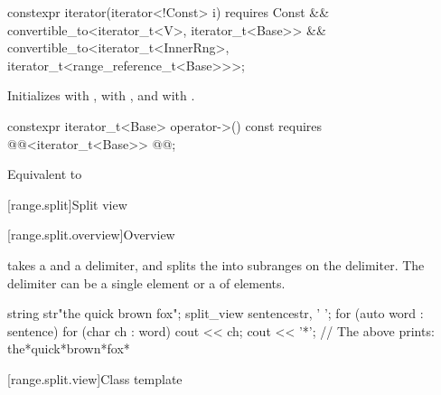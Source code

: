 \documentclass{wg21}
\begin{document}
\begin{itemdecl}
	constexpr iterator(iterator<!Const> i)
		requires Const &&
		convertible_to<iterator_t<V>, iterator_t<Base>> &&
		convertible_to<iterator_t<InnerRng>,
		iterator_t<range_reference_t<Base>>>;
\end{itemdecl}

\begin{itemdescr}
	\pnum
	\effects
	Initializes  with ,
	 with , and
	 with .
\end{itemdescr}


\begin{itemdecl}
	constexpr iterator_t<Base> operator->() const
	requires @@<iterator_t<Base>> @@;
\end{itemdecl}

\begin{itemdescr}
	\pnum
	\effects
	Equivalent to 
\end{itemdescr}

[range.split]{Split view}

[range.split.overview]{Overview}

\pnum
{} takes a  and a delimiter, and splits
the  into subranges on the delimiter. The delimiter can be
a single element or a  of elements.

\pnum
\begin{example}
\begin{codeblock}
	string str{"the quick brown fox"};
	split_view sentence{str, ' '};
	for (auto word : sentence) {
		for (char ch : word)
		cout << ch;
		cout << '*';
	}
	// The above prints: the*quick*brown*fox*
\end{codeblock}
\end{example}

[range.split.view]{Class template }
\end{document}
